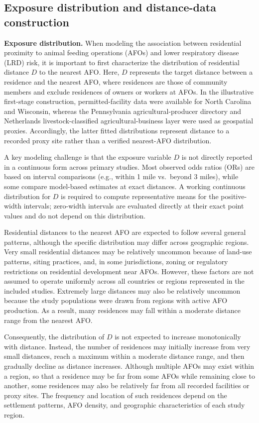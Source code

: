 \documentclass[journal=rsm]{CUP-JNL-DTM}%
\theoremstyle{definition}
\numberwithin{equation}{section}
\begin{document}
\subsection{Exposure distribution and distance-data construction} \label{sec:gamma_dist}

\noindent\textbf{Exposure distribution.}
When modeling the association between residential proximity to animal feeding operations (AFOs) and lower respiratory disease (LRD) risk, it is important to first characterize the distribution of residential distance $D$ to the nearest AFO. Here, $D$ represents the target distance between a residence and the nearest AFO, where residences are those of community members and exclude residences of owners or workers at AFOs. In the illustrative first-stage construction, permitted-facility data were available for North Carolina and Wisconsin, whereas the Pennsylvania agricultural-producer directory and Netherlands livestock-classified agricultural-business layer were used as geospatial proxies. Accordingly, the latter fitted distributions represent distance to a recorded proxy site rather than a verified nearest-AFO distribution.

A key modeling challenge is that the exposure variable $D$ is not directly
reported in a continuous form across primary studies. Most observed odds
ratios (ORs) are based on interval comparisons (e.g., within 1 mile vs.\ beyond
3 miles), while some compare model-based estimates at exact distances. A
working continuous distribution for $D$ is required to compute representative
means for the positive-width intervals; zero-width intervals are evaluated
directly at their exact point values and do not depend on this distribution.

Residential distances to the nearest AFO are expected to follow several
general patterns, although the specific distribution may differ across
geographic regions. Very small residential distances may be relatively
uncommon because of land-use patterns, siting practices, and, in some
jurisdictions, zoning or regulatory restrictions on residential development
near AFOs. However, these factors are not assumed to operate uniformly across
all countries or regions represented in the included studies. Extremely large
distances may also be relatively uncommon because the study populations were
drawn from regions with active AFO production. As a result, many residences
may fall within a moderate distance range from the nearest AFO.

Consequently, the distribution of $D$ is not expected to increase
monotonically with distance. Instead, the number of residences may initially
increase from very small distances, reach a maximum within a moderate distance
range, and then gradually decline as distance increases. Although multiple AFOs
may exist within a region, so that a residence may be far from some AFOs while
remaining close to another, some residences may also be relatively far from all
recorded facilities or proxy sites. The frequency and location of such residences depend on the
settlement patterns, AFO density, and geographic characteristics of each study
region.
\end{document}
